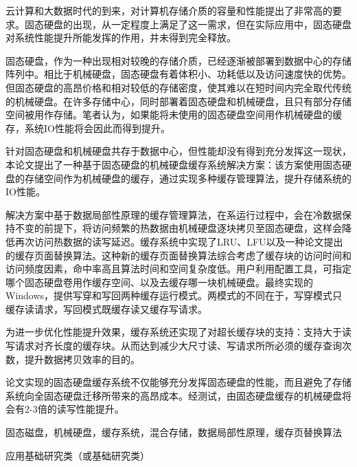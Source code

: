 
\begin{cabstract}

云计算和大数据时代的到来，对计算机存储介质的容量和性能提出了非常高的要求。固态硬盘的出现，从一定程度上满足了这一需求，但在实际应用中，固态硬盘对系统性能提升所能发挥的作用，并未得到完全释放。

固态硬盘，作为一种出现相对较晚的存储介质，已经逐渐被部署到数据中心的存储阵列中。相比于机械硬盘，固态硬盘有着体积小、功耗低以及访问速度快的优势。但固态硬盘的高昂价格和相对较低的存储密度，使其难以在短时间内完全取代传统的机械硬盘。在许多存储中心，同时部署着固态硬盘和机械硬盘，且只有部分存储空间被用作存储。笔者认为，如果能将未使用的固态硬盘空间用作机械硬盘的缓存，系统IO性能将会因此而得到提升。

针对固态硬盘和机械硬盘共存于数据中心，但性能却没有得到充分发挥这一现状，本论文提出了一种基于固态硬盘的机械硬盘缓存系统解决方案：该方案使用固态硬盘的存储空间作为机械硬盘的缓存，通过实现多种缓存管理算法，提升存储系统的IO性能。

解决方案中基于数据局部性原理的缓存管理算法，在系运行过程中，会在冷数据保持不变的前提下，将访问频繁的热数据由机械硬盘逐块拷贝至固态硬盘，这样会降低再次访问热数据的读写延迟。缓存系统中实现了LRU、LFU以及一种论文提出的缓存页面替换算法。这种新的缓存页面替换算法综合考虑了缓存块的访问时间和访问频度因素，命中率高且算法时间和空间复杂度低。用户利用配置工具，可指定哪个固态硬盘卷用作缓存空间、以及去缓存哪一块机械硬盘。最终实现的Windows，提供写穿和写回两种缓存运行模式。两模式的不同在于，写穿模式只缓存读请求，写回模式既缓存读又缓存写请求。

为进一步优化性能提升效果，缓存系统还实现了对超长缓存块的支持：支持大于读写请求对齐长度的缓存块。从而达到减少大尺寸读、写请求所所必须的缓存查询次数，提升数据拷贝效率的目的。

论文实现的固态硬盘缓存系统不仅能够充分发挥固态硬盘的性能，而且避免了存储系统向全固态硬盘迁移所带来的高昂成本。经测试，由固态硬盘缓存的机械硬盘将会有2-3倍的读写性能提升。

\end{cabstract}

\begin{ckeywords}
固态磁盘，机械硬盘，缓存系统，混合存储，数据局部性原理，缓存页替换算法
\end{ckeywords}

\begin{cthesistype}
应用基础研究类（或基础研究类）
\end{cthesistype}

